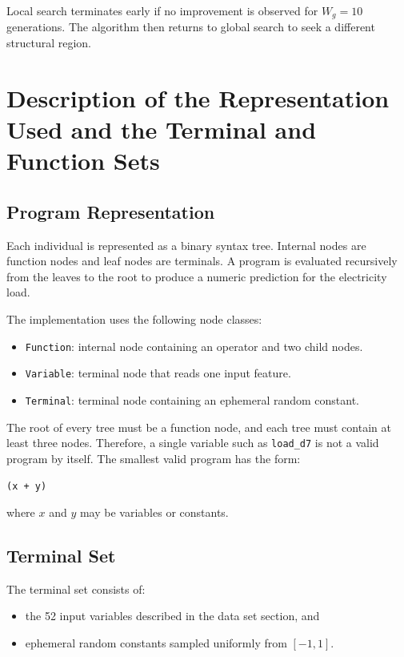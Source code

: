 \documentclass{article}
\begin{document}
Local search terminates early if no improvement is observed for $W_g = 10$ generations. The algorithm then returns to global search to seek a different structural region.

\section{Description of the Representation Used and the Terminal and Function Sets}

\subsection{Program Representation}

Each individual is represented as a binary syntax tree. Internal nodes are function nodes and leaf nodes are terminals. A program is evaluated recursively from the leaves to the root to produce a numeric prediction for the electricity load.

The implementation uses the following node classes:

\begin{itemize}
    \item \texttt{Function}: internal node containing an operator and two child nodes.
    \item \texttt{Variable}: terminal node that reads one input feature.
    \item \texttt{Terminal}: terminal node containing an ephemeral random constant.
\end{itemize}

The root of every tree must be a function node, and each tree must contain at least three nodes. Therefore, a single variable such as \texttt{load\_d7} is not a valid program by itself. The smallest valid program has the form:

\begin{center}
\texttt{(x + y)}
\end{center}

where $x$ and $y$ may be variables or constants.

\subsection{Terminal Set}

The terminal set consists of:

\begin{itemize}
    \item the 52 input variables described in the data set section, and
    \item ephemeral random constants sampled uniformly from $[-1, 1]$.
\end{itemize}
\end{document}
